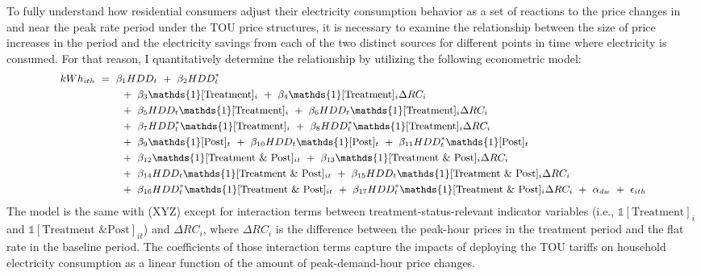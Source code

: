 To fully understand how residential consumers adjust their electricity consumption behavior as a set of reactions to the price changes in and near the peak rate period under the TOU price structures, it is necessary to examine the relationship between the size of price increases in the period and the electricity savings from each of the two distinct sources for different points in time where electricity is consumed. For that reason, I quantitatively determine the relationship by utilizing the following econometric model:
\begin{equation}
\small
\begin{split}
    kWh_{ith} \ 
    & = \ \beta_{1} HDD_{t} \ + \ \beta_{2} HDD_{t}^{*} \\
    & \hspace{0.7cm} + \ \beta_{3} \mathds{1}[\text{Treatment}]_{i} \ + \ \beta_{4} \mathds{1}[\text{Treatment}]_{i} \Delta RC_{i} \\
    & \hspace{0.7cm} + \ \beta_{5} HDD_{t} \mathds{1}[\text{Treatment}]_{i} \ + \ \beta_{6} HDD_{t} \mathds{1}[\text{Treatment}]_{i} \Delta RC_{i} \\
    & \hspace{0.7cm} + \ \beta_{7} HDD_{t}^{*} \mathds{1}[\text{Treatment}]_{i} \ + \ \beta_{8} HDD_{t}^{*} \mathds{1}[\text{Treatment}]_{i} \Delta RC_{i} \\
    & \hspace{0.7cm} + \ \beta_{9} \mathds{1}[\text{Post}]_{t} \ + \ \beta_{10} HDD_{t} \mathds{1}[\text{Post}]_{t} \ + \ \beta_{11} HDD_{t}^{*} \mathds{1}[\text{Post}]_{t} \\
    & \hspace{0.7cm} + \ \beta_{12} \mathds{1}[\text{Treatment \& Post}]_{it} \ + \ \beta_{13} \mathds{1}[\text{Treatment \& Post}]_{i} \Delta RC_{i} \\
    & \hspace{0.7cm} + \ \beta_{14} HDD_{t} \mathds{1}[\text{Treatment \& Post}]_{it} \ + \ \beta_{15} HDD_{t} \mathds{1}[\text{Treatment \& Post}]_{i} \Delta RC_{i} \\
    & \hspace{0.7cm} + \ \beta_{16} HDD_{t}^{*} \mathds{1}[\text{Treatment \& Post}]_{it} \ + \ \beta_{17} HDD_{t}^{*} \mathds{1}[\text{Treatment \& Post}]_{i} \Delta RC_{i} \ + \ \alpha_{dw} \ + \ \epsilon_{ith}
\end{split}
\end{equation}
The model is the same with (XYZ) except for interaction terms between treatment-status-relevant indicator variables (i.e., $\mathds{1}[\text{Treatment}]_{i}$ and $\mathds{1}[\text{Treatment \& Post}]_{it}$) and $\Delta RC_{i}$, where $\Delta RC_{i}$ is the difference between the peak-hour prices in the treatment period and the flat rate in the baseline period. The coefficients of those interaction terms capture the impacts of deploying the TOU tariffs on household electricity consumption as a linear function of the amount of peak-demand-hour price changes.

